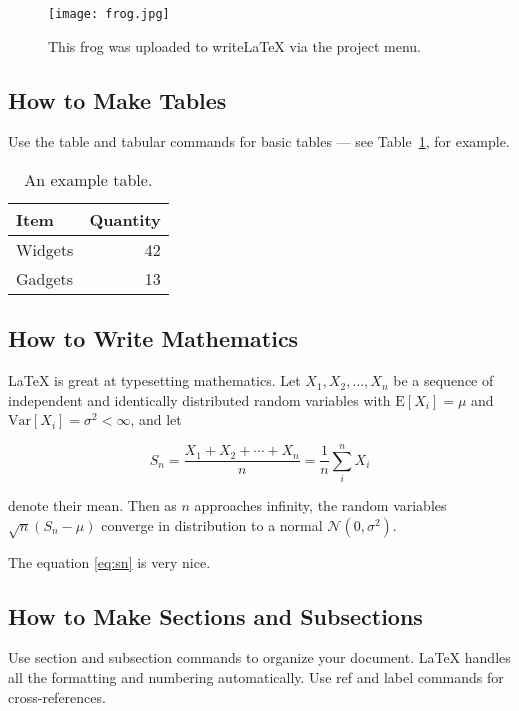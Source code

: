 \documentclass[a4paper]{article}
\begin{document}
    \begin{figure}
    \centering
    \texttt{[image: frog.jpg]}
    \caption{\label{fig:frog}This frog was uploaded to writeLaTeX via the project menu.}
    \end{figure}
    
    \subsection{How to Make Tables}
    
    Use the table and tabular commands for basic tables --- see Table~\ref{tab:widgets}, for example.
    
    \begin{table}
    \centering
    \begin{tabular}{l|r}
    Item & Quantity \\\hline
    Widgets & 42 \\
    Gadgets & 13
    \end{tabular}
    \caption{\label{tab:widgets}An example table.}
    \end{table}
    
    \subsection{How to Write Mathematics}
    
    \LaTeX{} is great at typesetting mathematics. Let $X_1, X_2, \ldots, X_n$ be a sequence of independent and identically distributed random variables with $\text{E}[X_i] = \mu$ and $\text{Var}[X_i] = \sigma^2 < \infty$, and let
    
    \begin{equation}
    S_n = \frac{X_1 + X_2 + \cdots + X_n}{n}
          = \frac{1}{n}\sum_{i}^{n} X_i
    \label{eq:sn}
    \end{equation}
    
    denote their mean. Then as $n$ approaches infinity, the random variables $\sqrt{n}(S_n - \mu)$ converge in distribution to a normal $\mathcal{N}(0, \sigma^2)$.
    
    The equation \ref{eq:sn} is very nice.
    
    \subsection{How to Make Sections and Subsections}
    
    Use section and subsection commands to organize your document. \LaTeX{} handles all the formatting and numbering automatically. Use ref and label commands for cross-references.
    
\end{document}
